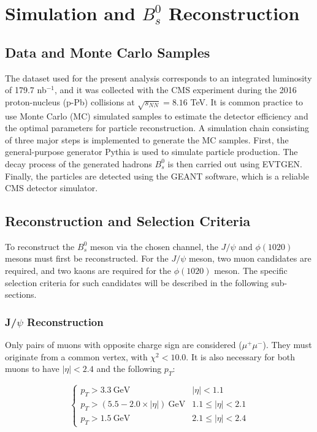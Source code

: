 \chapter[\leavevmode\newline Simulation, Selection and Reconstruction]{Simulation and $B^0_s$ Reconstruction}
\label{chap:Chapter_3}
\section{Data and Monte Carlo Samples}
The dataset used for the present analysis corresponds to an integrated luminosity of 179.7 nb$^{-1}$, and it was collected with the CMS experiment during the 2016 proton-nucleus (p-Pb) collisions at $\sqrt{s_{NN}} = 8.16$ TeV. It is common practice to use Monte Carlo (MC) simulated samples to estimate the detector efficiency and the optimal parameters for particle reconstruction. A simulation chain consisting of three major steps is implemented to generate the MC samples. First, the general-purpose generator Pythia is used to simulate particle production. The decay process of the generated hadrons $B^0_s$ is then carried out using EVTGEN. Finally, the particles are detected using the GEANT software, which is a reliable CMS detector simulator. %
\section{Reconstruction and Selection Criteria}%
To reconstruct the $B^0_s$ meson via the chosen channel, the $J/\psi$ and $\phi (1020)$ mesons must first be reconstructed. For the $J/\psi$ meson, two muon candidates are required, and two kaons are required for the $\phi (1020)$ meson. The specific selection criteria for such candidates will be described in the following sub-sections.
\subsection{J/$\psi$ Reconstruction}

Only pairs of muons with opposite charge sign are considered ($\mu^{+}\mu^{-}$). They must originate from a common vertex, with $\chi^2 < 10.0$. It is also necessary for both muons to have $|\eta| < 2.4$ and the following $p_T$:

\[ \begin{cases} 
	p_T > 3.3 \ \text{GeV} & |\eta| < 1.1 \\
	p_T > \left(5.5 - 2.0 \times |\eta|\right) \ \text{GeV} & 1.1 \leq |\eta| < 2.1 \\
	p_T > 1.5 \ \text{GeV} & 2.1 \leq |\eta| < 2.4 
\end{cases}
\] 


